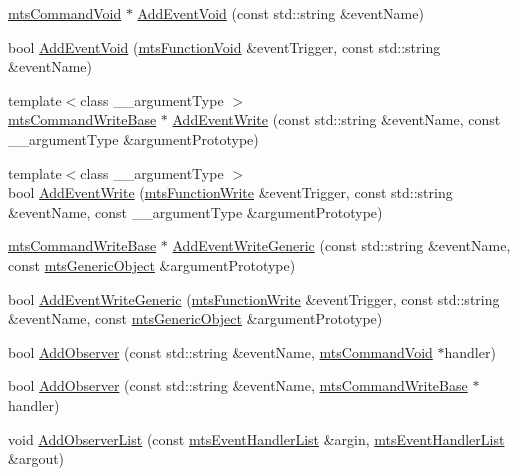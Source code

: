 {\bf }\par
\begin{DoxyCompactItemize}
\item 
\hyperlink{classmts_command_void}{mts\-Command\-Void} $\ast$ \hyperlink{classmts_interface_provided_a2277f5eca61d7f8ee3fb7dfc92fc44cd}{Add\-Event\-Void} (const std\-::string \&event\-Name)
\item 
bool \hyperlink{classmts_interface_provided_a2fa41be4c5193ef23103d040e2654c5b}{Add\-Event\-Void} (\hyperlink{classmts_function_void}{mts\-Function\-Void} \&event\-Trigger, const std\-::string \&event\-Name)
\item 
{\footnotesize template$<$class \-\_\-\-\_\-argument\-Type $>$ }\\\hyperlink{classmts_command_write_base}{mts\-Command\-Write\-Base} $\ast$ \hyperlink{classmts_interface_provided_a700ebfb28c1ef1b28a7a77c6198949e0}{Add\-Event\-Write} (const std\-::string \&event\-Name, const \-\_\-\-\_\-argument\-Type \&argument\-Prototype)
\item 
{\footnotesize template$<$class \-\_\-\-\_\-argument\-Type $>$ }\\bool \hyperlink{classmts_interface_provided_aa2dc4c89808debdd6c221ab36bac1979}{Add\-Event\-Write} (\hyperlink{classmts_function_write}{mts\-Function\-Write} \&event\-Trigger, const std\-::string \&event\-Name, const \-\_\-\-\_\-argument\-Type \&argument\-Prototype)
\item 
\hyperlink{classmts_command_write_base}{mts\-Command\-Write\-Base} $\ast$ \hyperlink{classmts_interface_provided_a20122111344850b258e41cafac774935}{Add\-Event\-Write\-Generic} (const std\-::string \&event\-Name, const \hyperlink{classmts_generic_object}{mts\-Generic\-Object} \&argument\-Prototype)
\item 
bool \hyperlink{classmts_interface_provided_ad1beb04b02968dd9cb740d913500a279}{Add\-Event\-Write\-Generic} (\hyperlink{classmts_function_write}{mts\-Function\-Write} \&event\-Trigger, const std\-::string \&event\-Name, const \hyperlink{classmts_generic_object}{mts\-Generic\-Object} \&argument\-Prototype)
\end{DoxyCompactItemize}

{\bf }\par
\begin{DoxyCompactItemize}
\item 
bool \hyperlink{classmts_interface_provided_a10cb738a0133cbbd47c13b7197533f27}{Add\-Observer} (const std\-::string \&event\-Name, \hyperlink{classmts_command_void}{mts\-Command\-Void} $\ast$handler)
\item 
bool \hyperlink{classmts_interface_provided_a8586c5e2f8394ae1e552199ed99ece54}{Add\-Observer} (const std\-::string \&event\-Name, \hyperlink{classmts_command_write_base}{mts\-Command\-Write\-Base} $\ast$handler)
\item 
void \hyperlink{classmts_interface_provided_a288043c859ac6c95b7042c7096e1e232}{Add\-Observer\-List} (const \hyperlink{classmts_event_handler_list}{mts\-Event\-Handler\-List} \&argin, \hyperlink{classmts_event_handler_list}{mts\-Event\-Handler\-List} \&argout)
\end{DoxyCompactItemize}

